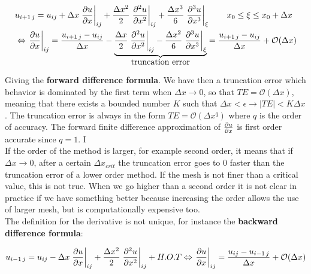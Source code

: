\begin{equation}
\begin{aligned}
&u_{i+1 \, j} = u_{ij}+ \Delta x \left.\frac{\partial u }{\partial x}\right| _{ij}  +\frac{\Delta x^2}{2} \left.\frac{\partial ^2u }{\partial x^2}\right| _{ij}  + \frac{\Delta x^3}{6} \left.\frac{\partial ^3u }{\partial x^3}\right| _{\xi} \qquad x_0 \leq \xi \leq x_0 + \Delta x\\
&\Leftrightarrow \left.\frac{\partial u }{\partial x}\right| _{ij} = \frac{u_{i+1 \, j} - u_{ij}}{\Delta x} -\underbrace{\frac{\Delta x}{2} \left.\frac{\partial ^2u }{\partial x^2}\right| _{ij}  - \frac{\Delta x^2}{6} \left.\frac{\partial ^3u }{\partial x^3}\right| _{\xi}}_{\mbox{truncation error}} = \frac{u_{i+1 \, j} - u_{ij}}{\Delta x} + \mathcal{O}(\Delta x)
\end{aligned}
\end{equation}

Giving the \textbf{forward difference formula}. We have then a truncation error which behavior is dominated by the first term when $\Delta x \rightarrow 0$, so that $TE = \mathcal{O}(\Delta x)$, meaning that there exists a bounded number $K$ such that $\Delta x < \epsilon \rightarrow |TE| < K\Delta x$. The truncation error is always in the form $TE = \mathcal{O}(\Delta x ^q)$ where $q$ is the order of accuracy. The forward finite difference approximation of $\frac{\partial u }{\partial x}$ is first order accurate since $q = 1$. I\\

If the order of the method is larger, for example second order, it means that if $\Delta x\rightarrow 0$, after a certain $\Delta x _{crit}$ the truncation error goes to 0 faster than the truncation error of a lower order method. If the mesh is not finer than a critical value, this is not true. When we go higher than a second order it is not clear in practice if we have something better because increasing the order allows the use of larger mesh, but is computationally expensive too.\\

The definition for the derivative is not unique, for instance the \textbf{backward difference formula}:

\begin{equation}
u_{i-1 \, j} = u_{ij}- \Delta x \left.\frac{\partial u }{\partial x}\right| _{ij}  +\frac{\Delta x^2}{2} \left.\frac{\partial ^2u }{\partial x^2}\right| _{ij}  + H.O.T \Leftrightarrow \left.\frac{\partial u }{\partial x}\right| _{ij} = \frac{u_{ij} - u_{i-1 \, j}}{\Delta x} + \mathcal{O}(\Delta x)
\end{equation}

